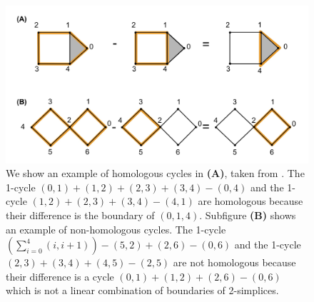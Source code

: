  \begin{figure}[h!]
\begin{center}
\includegraphics[width=1\textwidth]{figures/examplesorange.jpg} 
\end{center}
\caption{We show an example of homologous cycles in \textbf{(A)}, taken from \cite{TZH15}. The 1-cycle $(0,1) + (1,2) + (2,3) + (3,4) - (0,4)$ and the 1-cycle $(1,2) + (2,3) + (3,4) - (4,1)$ are homologous because their difference is the boundary of $(0,1,4)$. Subfigure \textbf{(B)} shows an example of non-homologous cycles. The 1-cycle $(\sum_{i=0}^4 (i, i+1))-(5,2)+(2,6)-(0,6)$ and the 1-cycle $(2,3) + (3,4)+(4,5)-(2,5)$ are not homologous because their difference is a cycle $(0,1)+(1,2)+(2,6)-(0,6)$ which is not a linear combination of boundaries of 2-simplices. } \label{fig:boundaryexample}
\end{figure}


